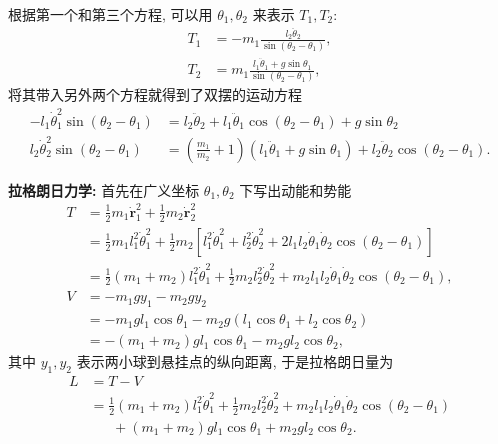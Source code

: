 \begin{example}[双摆]
\begin{align*}
    \end{align*}
    根据第一个和第三个方程, 可以用 $ \theta_1,\theta_2 $ 来表示 $ T_1,T_2 $:
    \begin{align*}
        T_1 &= -m_1\frac{l_2\ddot{\theta}_2}{\sin(\theta_2-\theta_1)},\\ 
        T_2 &= m_1\frac{l_1\ddot{\theta}_1+g\sin\theta_1}{\sin(\theta_2-\theta_1)},
    \end{align*}
    将其带入另外两个方程就得到了双摆的运动方程
    \begin{align*}
        -l_1\dot{\theta}_1^2\sin(\theta_2-\theta_1) &= l_2\ddot{\theta}_2+l_1\ddot{\theta}_1\cos(\theta_2-\theta_1)+g\sin\theta_2\\ 
        l_2\dot{\theta}_2^2\sin(\theta_2-\theta_1) &= \left( \frac{m_1}{m_2}+1 \right)\left( l_1\ddot{\theta}_1+g\sin\theta_1 \right)+l_2\ddot{\theta}_2\cos(\theta_2-\theta_1).
    \end{align*}

    {\bf 拉格朗日力学:} 首先在广义坐标 $ \theta_1,\theta_2 $ 下写出动能和势能
    \begin{align*}
        T &= \frac{1}{2}m_1\dot{\mathbf{r}}_1^2+\frac{1}{2}m_2\dot{\mathbf{r}}_2^2\\ 
        &= \frac{1}{2}m_1l_1^2\dot{\theta}_1^2+\frac{1}{2}m_2\left[ l_1^2\dot{\theta}_1^2+l_2^2\dot{\theta}_2^2+2l_1l_2\dot{\theta}_1\dot{\theta}_2\cos(\theta_2-\theta_1) \right]\\ 
        &= \frac{1}{2}(m_1+m_2)l_1^2\dot{\theta}_1^2+\frac{1}{2}m_2l_2^2\dot{\theta}_2^2+m_2l_1l_2\dot{\theta}_1\dot{\theta}_2\cos(\theta_2-\theta_1),\\
        V &= -m_1gy_1-m_2gy_2 \\ 
        &= -m_1gl_1\cos\theta_1-m_2g(l_1\cos\theta_1+l_2\cos\theta_2)\\ 
        &= -(m_1+m_2)gl_1\cos\theta_1-m_2gl_2\cos\theta_2,
    \end{align*}
    其中 $ y_1,y_2 $ 表示两小球到悬挂点的纵向距离, 于是拉格朗日量为
    \begin{align*}
        L &= T-V\\ 
        &= \frac{1}{2}(m_1+m_2)l_1^2\dot{\theta}_1^2+\frac{1}{2}m_2l_2^2\dot{\theta}_2^2+m_2l_1l_2\dot{\theta}_1\dot{\theta}_2\cos(\theta_2-\theta_1)\\ 
        &\phantom{=}\;+(m_1+m_2)gl_1\cos\theta_1+m_2gl_2\cos\theta_2.
    \end{align*}


\end{example}
